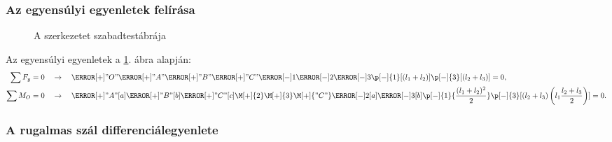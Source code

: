 \subsubsection{Az egyensúlyi egyenletek felírása}


\begin{figure}[H]
  \centering
  
  \vspace{-2mm}
  \caption{A szerkezetet szabadtestábrája}
  \label{fig:szta}
\end{figure}
\pagebreak

Az egyensúlyi egyenletek a \ref{fig:szta}. ábra alapján:
\begin{align}
  \sum F_y = 0 \quad & \rightarrow \quad
  \F[+]{"O"}
  \F[+]{"A"}
  \F[+]{"B"}
  \F[+]{"C"}
  \F[-]{1}
  \F[-]{2}
  \F[-]{3}
  \p[-]{1}[(l_1 + l_2)]
  \p[-]{3}[(l_2 + l_3)]
  = 0
  \text,
  \\
  \sum M_O = 0 \quad & \rightarrow \quad
  \F[+]{"A"}[a]
  \F[+]{"B"}[b]
  \F[+]{"C"}[c]
  \M[+]{2}
  \M[+]{3}
  \M[+]{"C"}
  \F[-]{2}[a]
  \F[-]{3}[b]
  \p[-]{1}{\frac{(l_1 + l_2)^2}{2}}
  \p[-]{3}[(l_2 + l_3)\left( l_1 \frac{l_2 + l_3}{2} \right)]
  = 0
  \text.
\end{align}

\subsubsection{A rugalmas szál differenciálegyenlete}


